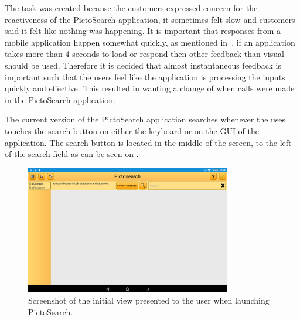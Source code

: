 The task was created because the customers expressed concern for the reactiveness of the PictoSearch application, it sometimes felt slow and customers said it felt like nothing was happening.
It is important that responses from a mobile application happen somewhat quickly, as mentioned in~\cite{Roto:2005:NNF:1062745.1062747}, if an application takes more than 4 seconds to load or respond then other feedback than visual should be used.
Therefore it is decided that almost instantaneous feedback is important such that the users feel like the application is processing the inputs quickly and effective.
This resulted in wanting a change of when calls were made in the PictoSearch application.

The current version of the PictoSearch application searches whenever the uses touches the search button on either the keyboard or on the GUI of the application.
The search button is located in the middle of the screen, to the left of the search field as can be seen on .
\begin{figure}[h]
    \centering
    \includegraphics[width=0.8\textwidth]{figures/img/screenshots/old_startup.png}
    \caption{Screenshot of the initial view presented to the user when launching PictoSearch.}\label{fig:screenshot_startup}
\end{figure}

